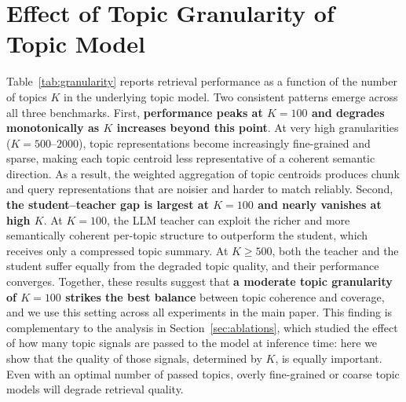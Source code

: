 \section{Effect of Topic Granularity of Topic Model}
\label{app:topic_granularity}

Table~\ref{tab:granularity} reports retrieval performance as a function of the number of topics $K$ in the underlying topic model. Two consistent patterns emerge across all three benchmarks. First, \textbf{performance peaks at $K=100$ and degrades monotonically as $K$ increases beyond this point}. At very high granularities ($K=500$--$2000$), topic representations become increasingly fine-grained and sparse, making each topic centroid less representative of a coherent semantic direction. As a result, the weighted aggregation of topic centroids produces chunk and query representations that are noisier and harder to match reliably. Second, \textbf{the student--teacher gap is largest at $K=100$ and nearly vanishes at high $K$}. At $K=100$, the LLM teacher can exploit the richer and more semantically coherent per-topic structure to outperform the student, which receives only a compressed topic summary. At $K \geq 500$, both the teacher and the student suffer equally from the degraded topic quality, and their performance converges. Together, these results suggest that \textbf{a moderate topic granularity of $K=100$ strikes the best balance} between topic coherence and coverage, and we use this setting across all experiments in the main paper. This finding is complementary to the analysis in Section~\ref{sec:ablations}, which studied the effect of how many topic signals are passed to the model at inference time: here we show that the quality of those signals, determined by $K$, is equally important. Even with an optimal number of passed topics, overly fine-grained or coarse topic models will degrade retrieval quality.

